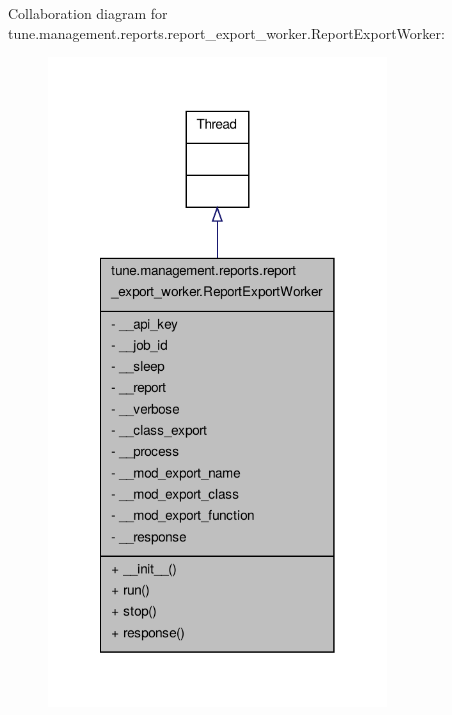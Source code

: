 Collaboration diagram for tune.\-management.\-reports.\-report\-\_\-export\-\_\-worker.\-Report\-Export\-Worker\-:
\nopagebreak
\begin{figure}[H]
\begin{center}
\leavevmode
\includegraphics[width=254pt]{classtune_1_1management_1_1reports_1_1report__export__worker_1_1ReportExportWorker__coll__graph}
\end{center}
\end{figure}
